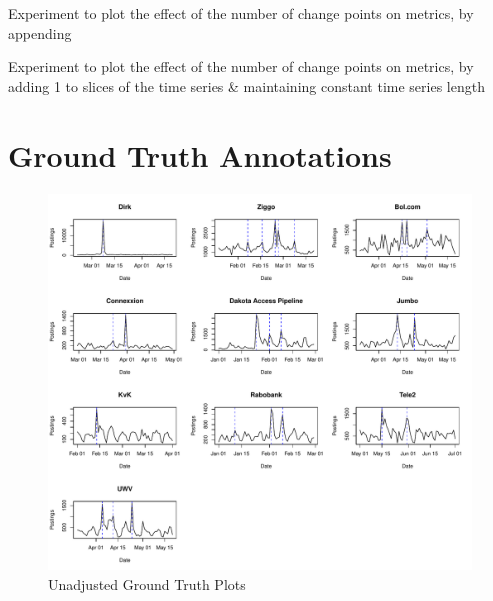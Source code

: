 \documentclass{uvamscse}	%
\begin{document}
\begin{algorithm}[h]
\caption{Experiment to plot the effect of the number of change points on metrics, by appending}
\end{algorithm}

\begin{algorithm}[h]
\caption{Experiment to plot the effect of the number of change points on metrics, by adding 1 to slices of the time series \& maintaining constant time series length}
\end{algorithm}

\chapter{Ground Truth Annotations}
\label{groundtruth}

\begin{figure}[h]
    \includegraphics[width=\textwidth]{figures/GroundTruthAnnotations}
    \caption{Unadjusted Ground Truth Plots}
    \label{fig:truth1}
\end{figure}
\end{document}
